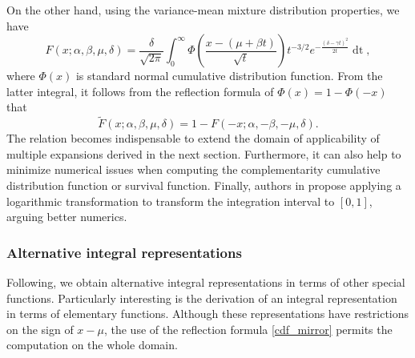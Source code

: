 \documentclass[10pt,a4paper,oneside]{article}
\numberwithin{equation}{section}
\begin{document}
On the other hand, using the variance-mean mixture distribution properties, we have
\begin{equation}\label{integral_phi}
F(x; \alpha, \beta, \mu, \delta) = \frac{\delta}{\sqrt{2\pi}}\int_{0}^{\infty} \Phi\left(\frac{x - (\mu +\beta t)}{\sqrt{t}}\right) t^{-3/2} e^{-\frac{(\delta - \gamma t)^2}{2t}} \mathop{dt},
\end{equation}
where $\Phi(x)$ is standard normal cumulative distribution function. From the latter integral, it follows from the reflection formula of $\Phi(x) = 1 - \Phi(-x)$ that
\begin{equation}\label{cdf_mirror}
\tilde{F}(x; \alpha, \beta, \mu, \delta) = 1- F(-x; \alpha, -\beta, -\mu, \delta).
\end{equation}
The relation becomes indispensable to extend the domain of applicability of multiple expansions derived in the next section. Furthermore, it can also help to minimize numerical issues when computing the complementarity cumulative distribution function or survival function. Finally, authors in \cite{Kalemanova2007} propose applying a logarithmic transformation to transform the integration interval to $[0, 1]$, arguing better numerics.

\subsubsection{Alternative integral representations}
Following, we obtain alternative integral representations in terms of other special functions. Particularly interesting is the derivation of an integral representation in terms of elementary functions. Although these representations have restrictions on the sign of $x-\mu$, the use of the reflection formula \eqref{cdf_mirror} permits the computation on the whole domain.
\end{document}

